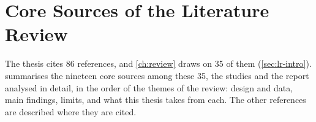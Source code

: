 \chapter{Core Sources of the Literature Review}\label{app:sources}

The thesis cites 86 references, and \cref{ch:review} draws on 35 of them (\cref{sec:lr-intro}).  summarises the nineteen core sources among these 35, the studies and the report analysed in detail, in the order of the themes of the review: design and data, main findings, limits, and what this thesis takes from each. The other references are described where they are cited.

